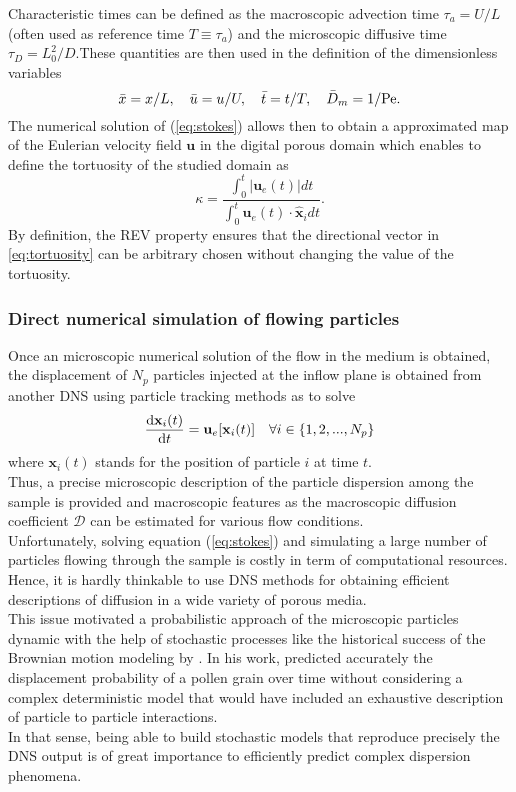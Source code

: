 Characteristic times can be defined as the macroscopic advection time $\tau_a=U/L$ (often used as reference time $T\equiv\tau_a$) and the microscopic diffusive time $\tau_D=L_0^2/D$.These quantities are then used in the definition of the dimensionless variables
\begin{equation}
\bar{x}=x/L,\quad \bar{u}=u/U,\quad \bar{t}=t/T,\quad \bar{D}_m=1/\mathrm{Pe}.
\end{equation}
The numerical solution of (\ref{eq:stokes}) allows then to obtain a approximated map of the Eulerian velocity field $\textbf{u}$ in the digital porous domain which enables to define the tortuosity of the studied domain as
\begin{equation}\label{eq:tortuosity}
\kappa=\frac{\int_0^t|\textbf{u}_e(t)|dt}{\int_0^t \textbf{u}_e(t)\cdot\hat{\textbf{x}}_idt}.
\end{equation}
By definition, the REV property ensures that the directional vector in \eqref{eq:tortuosity} can be arbitrary chosen without changing the value of the tortuosity.\\

\subsubsection{Direct numerical simulation of flowing particles}
Once an microscopic numerical solution of the flow in the medium is obtained, the displacement of $N_p$ particles injected at the inflow plane is obtained from another DNS using particle tracking methods as \citet{Pollock1988} to solve
\begin{equation}\label{eq:traject}
\dv{\textbf{x}_i(t)}{t}=\textbf{u}_e[\textbf{x}_i(t)]\quad\forall i\in\{1,2,...,N_p\}
\end{equation}
where $\textbf{x}_i(t)$ stands for the position of particle $i$ at time $t$.\\
Thus, a precise microscopic description of the particle dispersion among the sample is provided and macroscopic features as the macroscopic diffusion coefficient $\mathcal{D}$ can be estimated for various flow conditions.\\
Unfortunately, solving equation (\ref{eq:stokes}) and simulating a large number of particles flowing through the sample is costly in term of computational resources. Hence, it is hardly thinkable to use DNS methods for obtaining efficient descriptions of diffusion in a wide variety of porous media.\\
This issue motivated a probabilistic approach of the microscopic particles dynamic with the help of stochastic processes like the historical success of the Brownian motion modeling by \citet{Einstein1906}. 
In his work, \citeauthor{Einstein1906} predicted accurately the displacement probability of a pollen grain over time without considering a complex deterministic model that would have included an exhaustive description of particle to particle interactions.\\
In that sense, being able to build stochastic models that reproduce precisely the DNS output is of great importance to efficiently predict complex dispersion phenomena.

